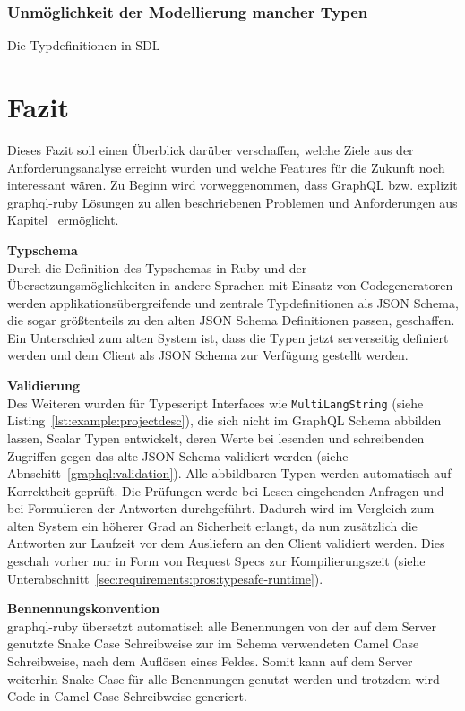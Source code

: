 \subsection{Unmöglichkeit der Modellierung mancher Typen}
Die Typdefinitionen in SDL

\chapter{Fazit}
Dieses Fazit soll einen Überblick darüber verschaffen, welche Ziele aus der Anforderungsanalyse erreicht wurden und welche Features für die Zukunft noch interessant wären.
Zu Beginn wird vorweggenommen, dass GraphQL bzw. explizit graphql-ruby Lösungen zu allen beschriebenen Problemen und Anforderungen aus Kapitel~ ermöglicht. 

\textbf{Typschema} \ \\
Durch die Definition des Typschemas in Ruby und der Übersetzungsmöglichkeiten in andere Sprachen mit Einsatz von Codegeneratoren werden applikationsübergreifende und zentrale Typdefinitionen als JSON Schema,
die sogar größtenteils zu den alten JSON Schema Definitionen passen, geschaffen. Ein Unterschied zum alten System ist, dass die Typen jetzt serverseitig definiert werden und dem Client als JSON Schema zur Verfügung gestellt werden. 


\textbf{Validierung} \ \\
Des Weiteren wurden für Typescript Interfaces wie \texttt{MultiLangString} (siehe Listing~\ref{lst:example:projectdesc}),  die sich nicht im GraphQL Schema abbilden lassen, Scalar Typen entwickelt, deren Werte bei lesenden und schreibenden Zugriffen gegen das alte JSON Schema validiert werden (siehe Abnschitt~\ref{graphql:validation}). Alle abbildbaren Typen werden automatisch auf Korrektheit geprüft. Die Prüfungen werde bei Lesen eingehenden Anfragen und bei Formulieren der Antworten durchgeführt. Dadurch wird im Vergleich zum alten System ein höherer Grad an Sicherheit erlangt, da nun zusätzlich die  Antworten zur Laufzeit vor dem Ausliefern an den Client validiert werden. Dies geschah vorher nur in Form von Request Specs zur Kompilierungszeit (siehe Unterabschnitt~\ref{sec:requirements:pros:typesafe-runtime}).

\textbf{Bennennungskonvention} \ \\
graphql-ruby übersetzt automatisch alle Benennungen von der auf dem Server genutzte Snake Case Schreibweise zur im Schema verwendeten Camel Case Schreibweise, nach dem Auflösen eines Feldes. Somit kann auf dem Server weiterhin Snake Case für alle Benennungen genutzt werden und trotzdem wird Code in Camel Case Schreibweise generiert.

